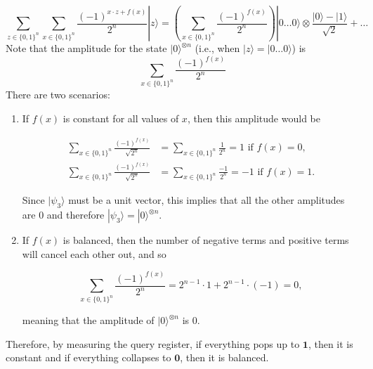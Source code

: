 \documentclass{article}
\newcounter{theorem}[section]
\begin{document}
\begin{theorem}
\begin{enumerate}
\begin{equation}
            \sum_{z \in \{0, 1\}^n} \sum_{x \in \{0, 1\}^n} \frac{(-1)^{x \cdot z + f(x)}}{2^n} |z\rangle = \left( \sum_{x \in \{0, 1\}^n} \frac{(-1)^{f(x)}}{2^n}\right) |0\ldots 0 \rangle \otimes \frac{|0\rangle - |1\rangle}{\sqrt{2}} + \ldots
          \end{equation}
          Note that the amplitude for the state $|0\rangle^{\otimes n}$ (i.e., when $|z\rangle = |0 \ldots 0\rangle$) is 
          \begin{equation} 
            \sum_{x \in \{0, 1\}^n} \frac{(-1)^{f(x)}}{2^n}
          \end{equation}
          There are two scenarios: 
          \begin{enumerate}
            \item If $f(x)$ is constant for all values of $x$, then this amplitude would be 

            \begin{align*} 
              \sum_{x \in \{0, 1\}^n} \frac{(-1)^{f(x)}}{\sqrt{2^n}} & = \sum_{x \in \{0, 1\}^n} \frac{1}{2^n} = 1 \text{ if } f(x) = 0, \\
              \sum_{x \in \{0, 1\}^n} \frac{(-1)^{f(x)}}{\sqrt{2^n}} & = \sum_{x \in \{0, 1\}^n} \frac{-1}{2^n} = -1 \text{ if } f(x) = 1.
            \end{align*}

            Since $|\psi_3 \rangle$ must be a unit vector, this implies that all the other amplitudes are $0$ and therefore $|\psi_3 \rangle = |0\rangle^{\otimes n}$. 

            \item If $f(x)$ is balanced, then the number of negative terms and positive terms will cancel each other out, and so 

              \begin{equation}
                \sum_{x \in \{0, 1\}^n} \frac{(-1)^{f(x)}}{2^n} = 2^{n-1} \cdot 1 + 2^{n-1} \cdot (-1) = 0,
              \end{equation}

            meaning that the amplitude of $|0\rangle^{\otimes n}$ is $0$. 
          \end{enumerate}
          Therefore, by measuring the query register, if everything pops up to $\mathbf{1}$, then it is constant and if everything collapses to $\mathbf{0}$, then it is balanced. 
      \end{enumerate}
    \end{theorem}
\end{document}
